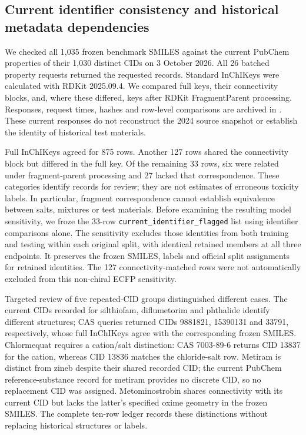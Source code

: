 \subsection*{Current identifier consistency and historical metadata dependencies}
We checked all 1,035 frozen benchmark SMILES against the current PubChem properties of their 1,030 distinct CIDs on 3 October 2026. All 26 batched property requests returned the requested records. Standard InChIKeys were calculated with RDKit 2025.09.4. We compared full keys, their connectivity blocks, and, where these differed, keys after RDKit FragmentParent processing. Responses, request times, hashes and row-level comparisons are archived in . These current responses do not reconstruct the 2024 source snapshot or establish the identity of historical test materials.

Full InChIKeys agreed for 875 rows. Another 127 rows shared the connectivity block but differed in the full key. Of the remaining 33 rows, six were related under fragment-parent processing and 27 lacked that correspondence. These categories identify records for review; they are not estimates of erroneous toxicity labels. In particular, fragment correspondence cannot establish equivalence between salts, mixtures or test materials. Before examining the resulting model sensitivity, we froze the 33-row \texttt{current\_identifier\_flagged} list using identifier comparisons alone. The sensitivity excludes those identities from both training and testing within each original split, with identical retained members at all three endpoints. It preserves the frozen SMILES, labels and official split assignments for retained identities. The 127 connectivity-matched rows were not automatically excluded from this non-chiral ECFP sensitivity.

Targeted review of five repeated-CID groups distinguished different cases. The current CIDs recorded for silthiofam, diflumetorim and phthalide identify different structures; CAS queries returned CIDs 9881821, 15390131 and 33791, respectively, whose full InChIKeys agree with the corresponding frozen SMILES. Chlormequat requires a cation/salt distinction: CAS 7003-89-6 returns CID 13837 for the cation, whereas CID 13836 matches the chloride-salt row. Metiram is distinct from zineb despite their shared recorded CID; the current PubChem reference-substance record for metiram provides no discrete CID, so no replacement CID was assigned. Metominostrobin shares connectivity with its current CID but lacks the latter's specified oxime geometry in the frozen SMILES. The complete ten-row ledger records these distinctions without replacing historical structures or labels.

